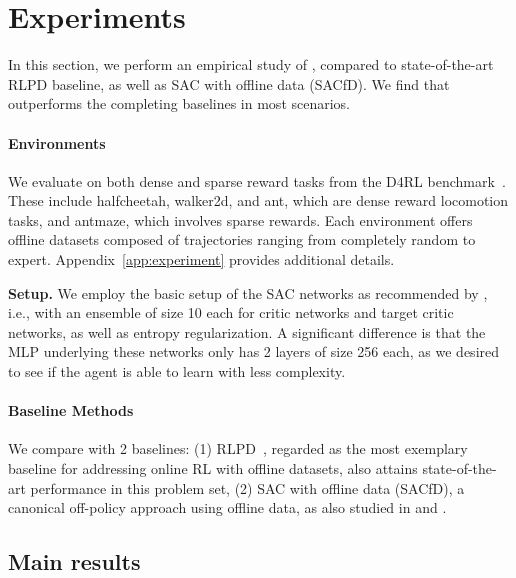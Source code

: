 

\renewcommand{\thesubfigure}{\alph{subfigure}}  %
\section{Experiments}


In this section, we perform an empirical study of \algname, compared to state-of-the-art RLPD baseline, as well as SAC with offline data (SACfD). We find that \algname outperforms the completing baselines in most scenarios.



\paragraph{Environments}
We evaluate \algname on both dense and sparse reward tasks from the D4RL benchmark~\citep{fu2020d4rl}. These include halfcheetah, walker2d, and ant, which are dense reward locomotion tasks, and antmaze, which involves sparse rewards. Each environment offers offline datasets composed of trajectories ranging from completely random to expert. Appendix~\ref{app:experiment} provides additional details.


{\textbf{Setup.}}
We employ the basic setup of the SAC networks as recommended by \citep{ball2023efficient}, i.e., with an ensemble of size 10 each for critic networks and target critic networks, as well as entropy regularization. A significant difference is that the MLP underlying these networks only has 2 layers of size 256 each, as we desired to see if the agent is able to learn with less complexity.

\paragraph{Baseline Methods}
We compare \algname with 2 baselines:
(1) RLPD~\citep{ball2023efficient}, regarded as the most exemplary baseline for addressing online RL with offline datasets, also attains state-of-the-art performance in this problem set, 
(2) SAC with offline data (SACfD), a canonical off-policy approach using offline data, as also studied in \citep{nair2020awac} and \citep{vecerik2017leveraging}.

\subsection{Main results}




